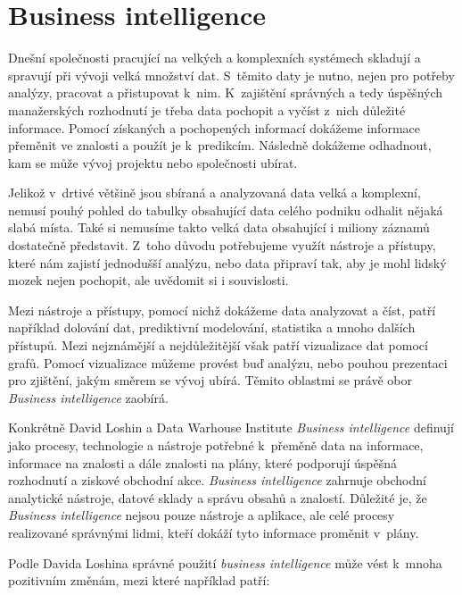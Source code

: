 \documentclass[czech,master]{diploma}
\begin{document}
\newpage %
\chapter{Business intelligence}
Dnešní společnosti pracující na velkých a komplexních systémech skladují a spravují při vývoji velká množství dat. S~těmito daty je nutno, nejen pro potřeby analýzy, pracovat a přistupovat k~nim. K~zajištění správných a tedy úspěšných manažerských rozhodnutí je třeba data pochopit a vyčíst z~nich důležité informace. Pomocí získaných a pochopených informací dokážeme informace přeměnit ve znalosti a použít je k~predikcím. Následně dokážeme odhadnout, kam se může vývoj projektu nebo společnosti ubírat.

Jelikož v~drtivé většině jsou sbíraná a analyzovaná data velká a komplexní, nemusí pouhý pohled do tabulky obsahující data celého podniku odhalit nějaká slabá místa. Také si nemusíme takto velká data obsahující i miliony záznamů dostatečně představit. Z~toho důvodu potřebujeme využít nástroje a přístupy, které nám zajistí jednodušší analýzu, nebo data připraví tak, aby je mohl lidský mozek nejen pochopit, ale uvědomit si i souvislosti.

Mezi nástroje a přístupy, pomocí nichž dokážeme data analyzovat a číst, patří například dolování dat, prediktivní modelování, statistika a mnoho dalších přístupů. Mezi nejznámější a nejdůležitější však patří vizualizace dat pomocí grafů. Pomocí vizualizace můžeme provést buď analýzu, nebo pouhou prezentaci pro zjištění, jakým směrem se vývoj ubírá. Těmito oblastmi se právě obor \textit{Business intelligence} zaobírá.

Konkrétně David Loshin \cite{ref:bi_loshin_david} a Data Warhouse Institute \textit{Business intelligence} definují jako procesy, technologie a nástroje potřebné k~přeměně data na informace, informace na znalosti a dále znalosti na plány, které podporují úspěšná rozhodnutí a ziskové obchodní akce. \textit{Business intelligence} zahrnuje obchodní analytické nástroje, datové sklady a správu obsahů a znalostí. Důležité je, že \textit{Business intelligence} nejsou pouze nástroje a aplikace, ale celé procesy realizované správnými lidmi, kteří dokáží tyto informace proměnit v~plány.

Podle Davida Loshina \cite{ref:bi_loshin_david} správné použití \textit{business intelligence} může vést k~mnoha pozitivním změnám, mezi které například patří:
\end{document}
